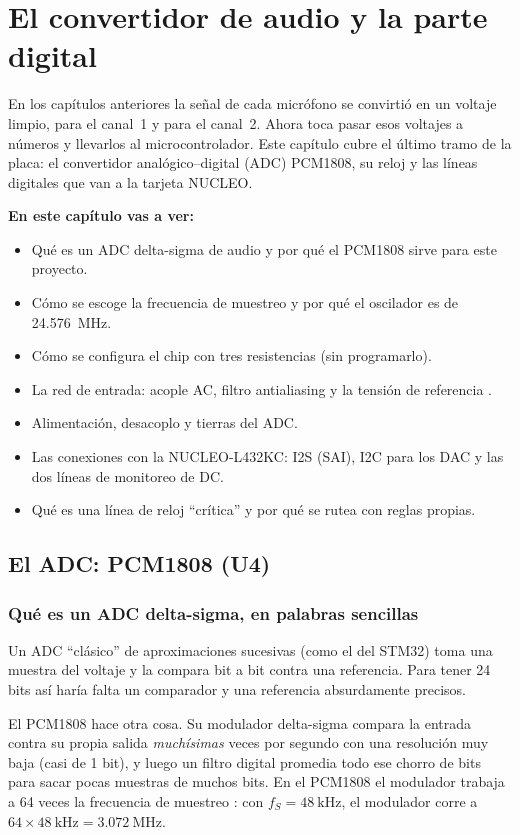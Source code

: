 \chapter{El convertidor de audio y la parte digital}\label{cap:digital}

En los capítulos anteriores la señal de cada micrófono se convirtió en un voltaje limpio,  para el canal~1 y  para el canal~2. Ahora toca pasar esos voltajes a números y llevarlos al microcontrolador. Este capítulo cubre el último tramo de la placa: el convertidor analógico--digital (ADC) PCM1808, su reloj y las líneas digitales que van a la tarjeta NUCLEO.

\textbf{En este capítulo vas a ver:}
\begin{itemize}
  \item Qué es un ADC delta-sigma de audio y por qué el PCM1808 sirve para este proyecto.
  \item Cómo se escoge la frecuencia de muestreo y por qué el oscilador es de \SI{24.576}{\mega\hertz}.
  \item Cómo se configura el chip con tres resistencias (sin programarlo).
  \item La red de entrada: acople AC, filtro antialiasing y la tensión de referencia .
  \item Alimentación, desacoplo y tierras del ADC.
  \item Las conexiones con la NUCLEO-L432KC: I2S (SAI), I2C para los DAC y las dos líneas de monitoreo de DC.
  \item Qué es una línea de reloj ``crítica'' y por qué se rutea con reglas propias.
\end{itemize}

\section{El ADC: PCM1808 (U4)}\label{sec:c04-pcm}

\subsection{Qué es un ADC delta-sigma, en palabras sencillas}

Un ADC ``clásico'' de aproximaciones sucesivas (como el del STM32) toma una muestra del voltaje y la compara bit a bit contra una referencia. Para tener 24 bits así haría falta un comparador y una referencia absurdamente precisos.

El PCM1808 hace otra cosa. Su modulador delta-sigma compara la entrada contra su propia salida \emph{muchísimas} veces por segundo con una resolución muy baja (casi de 1 bit), y luego un filtro digital promedia todo ese chorro de bits para sacar pocas muestras de muchos bits. En el PCM1808 el modulador trabaja a 64 veces la frecuencia de muestreo : con $f_S=\SI{48}{\kilo\hertz}$, el modulador corre a $64\times\SI{48}{\kilo\hertz}=\SI{3.072}{\mega\hertz}$.

